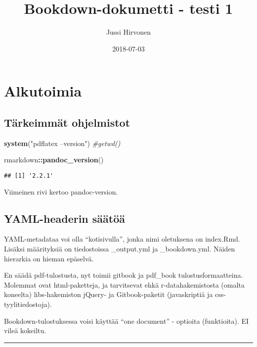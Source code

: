 \documentclass[finnish,]{book}
\title{Bookdown-dokumetti - testi 1}
\author{Jussi Hirvonen}
\date{2018-07-03}
\newenvironment{Shaded}{\begin{snugshade}}{\end{snugshade}}
\newcommand{\CommentTok}[1]{\textcolor[rgb]{0.56,0.35,0.01}{\textit{#1}}}
\newcommand{\KeywordTok}[1]{\textcolor[rgb]{0.13,0.29,0.53}{\textbf{#1}}}
\newcommand{\NormalTok}[1]{#1}
\newcommand{\OperatorTok}[1]{\textcolor[rgb]{0.81,0.36,0.00}{\textbf{#1}}}
\newcommand{\StringTok}[1]{\textcolor[rgb]{0.31,0.60,0.02}{#1}}
\theoremstyle{definition}
\theoremstyle{definition}
\theoremstyle{definition}
\theoremstyle{remark}
\begin{document}
\maketitle

{
\setcounter{tocdepth}{1}
\tableofcontents
}
\hypertarget{alkutoimia}{%
\chapter{Alkutoimia}\label{alkutoimia}}

\hypertarget{tarkeimmat-ohjelmistot}{%
\section{Tärkeimmät ohjelmistot}\label{tarkeimmat-ohjelmistot}}

\begin{Shaded}
\begin{Highlighting}[]
\KeywordTok{system}\NormalTok{(}\StringTok{"pdflatex --version"}\NormalTok{)}
\CommentTok{#getwd()}

\NormalTok{rmarkdown}\OperatorTok{::}\KeywordTok{pandoc_version}\NormalTok{()}
\end{Highlighting}
\end{Shaded}

\begin{verbatim}
## [1] '2.2.1'
\end{verbatim}

Viimeinen rivi kertoo pandoc-version.

\hypertarget{yaml-headerin-saatoa}{%
\section{YAML-headerin säätöä}\label{yaml-headerin-saatoa}}

YAML-metadataa voi olla ``kotisivulla'', jonka nimi oletuksena on
index.Rmd. Lisäksi määrityksiä on tiedostoissa \_output.yml ja
\_bookdown.yml. Näiden hierarkia on hieman epäselvä.

En säädä pdf-tulostusta, nyt toimii gitbook ja pdf\_book
tulostusformaatteina. Molemmat ovat html-paketteja, ja tarvitsevat ehkä
r-datahakemistosta (omalta koneelta) libs-hakemiston jQuery- ja
Gitbook-paketit (javaskriptiä ja css-tyylitiedostoja).

Bookdown-tulostuksessa voisi käyttää ``one document'' - optioita
(funktioita). EI vileä kokeiltu.

\begin{center}\rule{0.5\linewidth}{\linethickness}\end{center}
\end{document}
